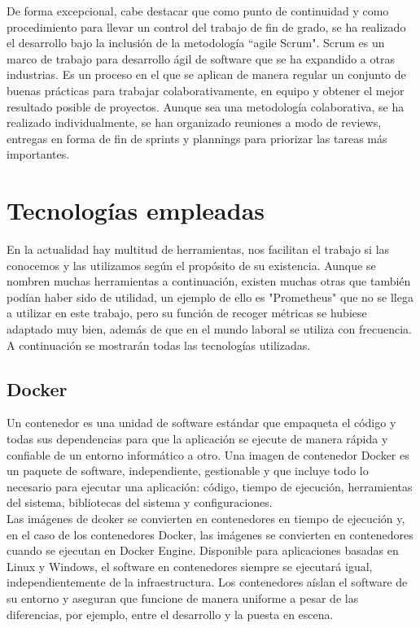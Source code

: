 \documentclass[ spanish, a4paper, 12pt, oneside]{report}
\begin{document}
De forma excepcional, cabe destacar que como punto de continuidad y como procedimiento para llevar un control del trabajo de fin de grado, se ha realizado el desarrollo bajo la inclusión de la 
metodología ``agile Scrum". Scrum es un marco de trabajo para desarrollo ágil de software que se ha expandido a otras industrias. Es un proceso en el que se aplican de manera regular un conjunto 
de buenas prácticas para trabajar colaborativamente, en equipo y obtener el mejor resultado posible de proyectos. Aunque sea una metodología colaborativa, se ha realizado individualmente, se han organizado 
reuniones a modo de reviews, entregas en forma de fin de sprints y plannings para priorizar las tareas más importantes.\\

\section{Tecnologías empleadas}
En la actualidad hay multitud de herramientas, nos facilitan el trabajo si las conocemos y las utilizamos según el propósito de su existencia. 
Aunque se nombren muchas herramientas a continuación, existen muchas otras que también podían haber sido de utilidad, un ejemplo de ello es "Prometheus" 
que no se llega a utilizar en este trabajo, pero su función de recoger métricas se hubiese adaptado muy bien, además de que en el mundo laboral se utiliza con 
frecuencia.\\

A continuación se mostrarán todas las tecnologías utilizadas.\\

\subsection{Docker}
Un contenedor es una unidad de software estándar que empaqueta el código y todas sus dependencias para que la aplicación 
se ejecute de manera rápida y confiable de un entorno informático a otro. Una imagen de contenedor Docker es un paquete 
de software, independiente, gestionable y que incluye todo lo necesario para ejecutar una aplicación: código, tiempo 
de ejecución, herramientas del sistema, bibliotecas del sistema y configuraciones.\\

Las imágenes de dcoker se convierten en contenedores en tiempo de ejecución y, en el caso de los contenedores Docker, 
las imágenes se convierten en contenedores cuando se ejecutan en Docker Engine. Disponible para aplicaciones basadas en 
Linux y Windows, el software en contenedores siempre se ejecutará igual, independientemente de la infraestructura. Los 
contenedores aíslan el software de su entorno y aseguran que funcione de manera uniforme a pesar de las diferencias, por 
ejemplo, entre el desarrollo y la puesta en escena.\\
\end{document}
